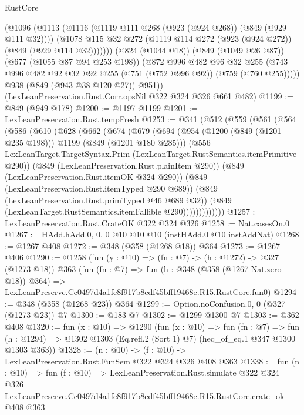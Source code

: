 \begin{lexlean}{RustCore}
\begin{coremodule}
            (@1096
              (@1113
                (@1116 (@1119 @111 @268 (@923 (@924 @268)) (@849 (@929 @111 @32))))
                (@1078 @115 @32 @272 (@1119 @114 @272 (@923 (@924 @272)) (@849 (@929 @114 @32)))))))
          (@824 (@1044 @18))
          (@849 (@1049 @26 @87))
          (@677 (@1055 @87 @94 @253 @198))
          (@872
            @996
            @482
            @96
            @32
            @255
            (@743 @996 @482 @92 @32 @92 @255 (@751 (@752 @996 @92)) (@759 (@760 @255)))))
        @938
        (@849 (@943 @38 @120 @27))
        @951))
    (LexLeanPreservation.Rust.Corr.opsNil @322 @324 @326 @661 @482)
@1199 := @849 (@949 @178)
@1200 := @1197 @1199
@1201 := LexLeanPreservation.Rust.tempFresh
@1253 := @341
    (@512
      (@559
        (@561
          (@564
            (@586
              (@610
                (@628
                  (@662
                    (@674
                      (@679
                        (@694
                          (@954 (@1200 (@849 (@1201 @235 @198))) @1199 (@849 (@1201 @180 @285)))
                          (@556
                            LexLeanTarget.TargetSyntax.Prim
                            (LexLeanTarget.RustSemantics.itemPrimitive @290))
                          (@849 (LexLeanPreservation.Rust.plainItem @290))
                          (@849 (LexLeanPreservation.Rust.itemOK @324 @290))
                          (@849 (LexLeanPreservation.Rust.itemTyped @290 @689))
                          (@849 (LexLeanPreservation.Rust.primTyped @46 @689 @32))
                          (@849 (LexLeanTarget.RustSemantics.itemFallible @290)))))))))))))
@1257 := LexLeanPreservation.Rust.CrateOK @322 @324 @326
@1258 := Nat.casesOn.{0}
@1267 := HAdd.hAdd.{0, 0, 0} @10 @10 @10 (instHAdd.{0} @10 instAddNat)
@1268 := @1267 @408
@1272 := @348 (@358 (@1268 @18)) @364
@1273 := @1267 @406
@1290 := @1258
    (fun (y : @10) => (fn : @7) -> (h : @1272) -> @327 (@1273 @18))
    @363
    (fun (fn : @7) =>
    fun (h : @348 (@358 (@1267 Nat.zero @18)) @364) =>
    LexLeanPreserve.Cc0497d4a1fc8f917b8cdf45bff19468e.R15.RustCore.fun0)
@1294 := @348 (@358 (@1268 @23)) @364
@1299 := Option.noConfusion.{0, 0} (@327 (@1273 @23)) @7
@1300 := @183 @7
@1302 := @1299 @1300 @7
@1303 := @362 @408
@1320 := fun (x : @10) =>
  @1290
    (fun (x : @10) =>
    fun (fn : @7) =>
    fun (h : @1294) => @1302 @1303 (Eq.refl.{2} (Sort 1) @7) (heq_of_eq.{1} @347 @1300 @1303 @363))
@1328 := (n : @10) -> (f : @10) -> LexLeanPreservation.Rust.FunSem @322 @324 @326 @408 @363
@1338 := fun (n : @10) =>
  fun (f : @10) =>
  LexLeanPreservation.Rust.simulate
    @322
    @324
    @326
    LexLeanPreserve.Cc0497d4a1fc8f917b8cdf45bff19468e.R15.RustCore.crate_ok
    @408
    @363
\end{coremodule}
\end{lexlean}
